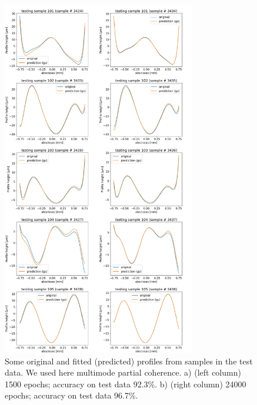\documentclass[preprint]{iucr}
\begin{document}
\begin{figure}\label{fig:multimode}
\includegraphics[width=0.75\textwidth]{figures/figure_multimode.pdf}




\caption{
Some original and fitted (predicted) profiles from samples in the test data. We used here multimode partial coherence.
a) (left column) 1500 epochs;
accuracy on test data 92.3\%. 
b) (right column) 24000 epochs;
accuracy on test data 96.7\%.
    }
\end{figure}
\end{document}
